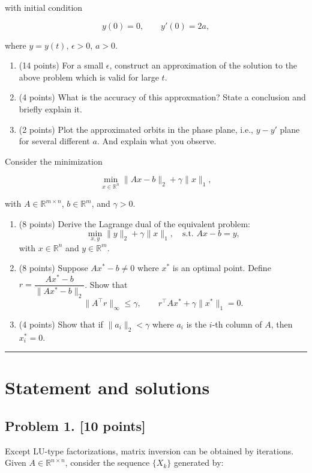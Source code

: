 \documentclass[11pt,a4paper]{article}
\newcommand{\examstatement}[1]{%
  \par\addvspace{0.85em}%
  \noindent{\bfseries #1}\par\nobreak\addvspace{0.28em}%
}
\begin{document}
with initial condition

\[
y(0) = 0,\qquad y'(0) = 2a,
\]

where \(y = y(t)\), \(\epsilon > 0\), \(a > 0\).
\begin{enumerate}[label=(\alph*)]
    \item (14 points) For a small \(\epsilon\), construct an approximation of the solution to the above problem which is valid for large \(t\).
    \item (4 points) What is the accuracy of this approxmation? State a conclusion and briefly explain it.
    \item (2 points) Plot the approximated orbits in the phase plane, i.e., \(y - y'\) plane for several different \(a\). And explain what you observe.
\end{enumerate}

\examstatement{Problem 7. [20 points]}
Consider the minimization

\[
\min_{x \in \mathbb{R}^{n}} \|Ax - b\|_{2} + \gamma \|x\|_{1},
\]

with \(A \in \mathbb{R}^{m \times n}\), \(b \in \mathbb{R}^{m}\), and \(\gamma > 0\).
\begin{enumerate}[label=(\alph*)]
    \item (8 points) Derive the Lagrange dual of the equivalent problem:
    \[
    \min_{x,y} \|y\|_{2} + \gamma \|x\|_{1}, \quad \text{s.t. } Ax - b = y,
    \]
    with \(x \in \mathbb{R}^{n}\) and \(y \in \mathbb{R}^{m}\).
    \item (8 points) Suppose \(Ax^{*} - b \neq 0\) where \(x^{*}\) is an optimal point. Define \(r = \dfrac{Ax^{*} - b}{\|Ax^{*} - b\|_{2}}\). Show that
    \[
    \|A^{\top} r\|_{\infty} \le \gamma, \qquad r^{\top} A x^{*} + \gamma \|x^{*}\|_{1} = 0.
    \]
    \item (4 points) Show that if \(\|a_{i}\|_{2} < \gamma\) where \(a_{i}\) is the \(i\)-th column of \(A\), then \(x^{*}_{i} = 0\).
\end{enumerate}

\noindent\rule{\linewidth}{0.4pt}

\section{Statement and solutions}

\subsection{Problem 1. [10 points]}
Except LU-type factorizations, matrix inversion can be obtained by iterations. Given \(A \in \mathbb{R}^{n \times n}\), consider the sequence \(\{X_{k}\}\) generated by:
\end{document}
